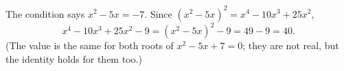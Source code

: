 The condition says $x^2-5x=-7$. Since $(x^2-5x)^2=x^4-10x^3+25x^2$,
\[
x^4-10x^3+25x^2-9=(x^2-5x)^2-9=49-9=\boxed{40}.
\]
(The value is the same for both roots of $x^2-5x+7=0$; they are not real, but the identity holds for them too.)
